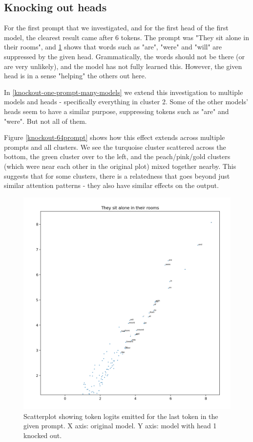 \documentclass{article}
\begin{document}
\subsection{Knocking out heads}

For the first prompt that we investigated, and for the first head of the first model, the clearest result came after 6 tokens. The prompt was "They sit alone in their rooms", and \ref{fig:knockout-one-prompt} shows that words such as "are", "were" and "will" are suppressed by the given head. Grammatically, the words should not be there (or are very unlikely), and the model has not fully learned this. However, the given head is in a sense "helping" the others out here.

In \ref{knockout-one-prompt-many-models} we extend this investigation to multiple models and heads - specifically everything in cluster 2. Some of the other models' heads seem to have a similar purpose, suppressing tokens such as "are" and "were". But not all of them.

Figure \ref{knockout-64prompt} shows how this effect extends across multiple prompts and all clusters. We see the turquoise cluster scattered across the bottom, the green cluster over to the left, and the peach/pink/gold clusters (which were near each other in the original plot) mixed together nearby. This suggests that for some clusters, there is a relatedness that goes beyond just similar attention patterns - they also have similar effects on the output.

\begin{figure}
	\includegraphics[width=\textwidth]{images/knockout-one-prompt.png}
	\caption{Scatterplot showing token logits emitted for the last token in the given prompt. X axis: original model. Y axis: model with head 1 knocked out.}
	\label{fig:knockout-one-prompt}
\end{figure}
\end{document}
